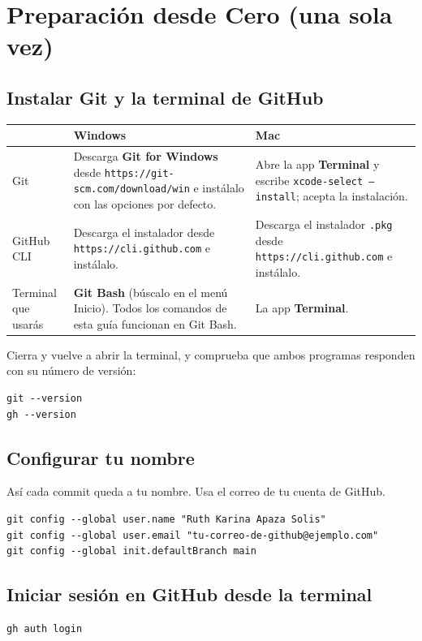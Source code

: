 \documentclass[11pt,a4paper]{article}
\begin{document}
\section{Preparación desde Cero (una sola vez)}

\subsection{Instalar Git y la terminal de GitHub}
{\small
{}
\noindent\begin{tabularx}{\textwidth}{@{}P{2.2cm} L L@{}}
\toprule
{}
& \textbf{Windows} & \textbf{Mac} \\
\midrule
Git & Descarga \textbf{Git for Windows} desde \nolinkurl{https://git-scm.com/download/win} e instálalo con las opciones por defecto. & Abre la app \textbf{Terminal} y escribe \texttt{xcode-select --install}; acepta la instalación. \\
GitHub CLI & Descarga el instalador desde \nolinkurl{https://cli.github.com} e instálalo. & Descarga el instalador \texttt{.pkg} desde \nolinkurl{https://cli.github.com} e instálalo. \\
Terminal que usarás & \textbf{Git Bash} (búscalo en el menú Inicio). Todos los comandos de esta guía funcionan en Git Bash. & La app \textbf{Terminal}. \\
\bottomrule
\end{tabularx}
}

\vspace{0.1cm}
\noindent Cierra y vuelve a abrir la terminal, y comprueba que ambos programas responden con su número de versión:

\begin{lstlisting}
git --version
gh --version
\end{lstlisting}

\subsection{Configurar tu nombre}
Así cada commit queda a tu nombre. Usa el correo de tu cuenta de GitHub.

\begin{lstlisting}
git config --global user.name "Ruth Karina Apaza Solis"
git config --global user.email "tu-correo-de-github@ejemplo.com"
git config --global init.defaultBranch main
\end{lstlisting}

\subsection{Iniciar sesión en GitHub desde la terminal}
\begin{lstlisting}
gh auth login
\end{lstlisting}
\end{document}
